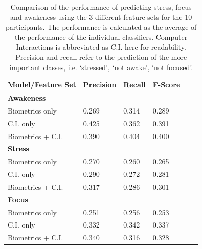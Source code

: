 \begin{table}
\begin{center}
\begin{tabular}{llllll}
\hline
Model/Feature Set & Precision & Recall & F-Score \\ %
\hline
\textbf{Awakeness}\\
\hspace{3mm}Biometrics only  & 0.269 & 0.314 & 0.289 \\ %
\hspace{3mm}C.I. only  & 0.425 & 0.362 & 0.391 \\ %
\hspace{3mm}Biometrics + C.I. & 0.390 & 0.404 & 0.400 \\ %
\hline
\textbf{Stress}\\
\hspace{3mm}Biometrics only  & 0.270 &	0.260 & 0.265 \\ %
\hspace{3mm}C.I. only & 0.290 & 0.272 & 0.281 \\ %
\hspace{3mm}Biometrics + C.I. & 0.317 & 0.286 & 0.301 \\ %
\hline
\textbf{Focus}\\
\hspace{3mm}Biometrics only & 0.251 & 0.256 & 0.253 \\ %
\hspace{3mm}C.I. only & 0.332 & 0.342 & 0.337 \\ %
\hspace{3mm}Biometrics + C.I. & 0.340 & 0.316 & 0.328 \\ %
\hline
\end{tabular}
\caption{Comparison of the performance of predicting stress, focus and awakeness using the 3 different feature sets for the 10 participants. The performance is calculated as the average of the performance of the individual classifiers. Computer Interactions is abbreviated as C.I. here for readability. Precision and recall refer to the prediction of the more important classes, i.e. `stressed', `not awake', `not focused'.}
\label{ciPerformance}
\end{center}
\end{table}

